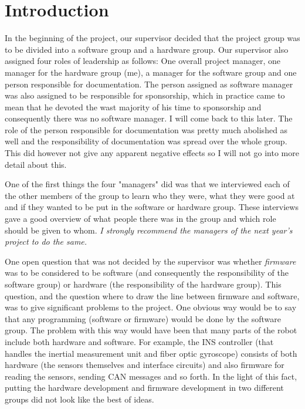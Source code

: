 
\section{Introduction}\label{sec:introduction}
In the beginning of the project, our supervisor decided that the project group was to be divided into a software group and a hardware group. Our supervisor also assigned four roles of leadership as follows: One overall project manager, one manager for the hardware group (me), a manager for the software group and one person responsible for documentation. \newline
The person assigned as software manager was also assigned to be responsible for sponsorship, which in practice came to mean that he devoted the wast majority of his time to sponsorship and consequently there was no software manager. I will come back to this later. \newline
The role of the person responsible for documentation was pretty much abolished as well and the responsibility of documentation was spread over the whole group. This did however not give any apparent negative effects so I will not go into more detail about this.

One of the first things the four "managers" did was that we interviewed each of the other members of the group to learn who they were, what they were good at and if they wanted to be put in the software or hardware group. These interviews gave a good overview of what people there was in the group and which role should be given to whom. \emph{I strongly recommend the managers of the next year's project to do the same.}

One open question that was not decided by the supervisor was whether \emph{firmware} was to be considered to be software (and consequently the responsibility of the software group) or hardware (the responsibility of the hardware group). This question, and the question where to draw the line between firmware and software, was to give significant problems to the project. \newline
One obvious way would be to say that any programming (software or firmware) would be done by the software group. The problem with this way would have been that many parts of the robot include both hardware and software. For example, the INS controller (that handles the inertial measurement unit and fiber optic gyroscope) consists of both hardware (the sensors themselves and interface circuits) and also firmware for reading the sensors, sending CAN messages and so forth. In the light of this fact, putting the hardware development and firmware development in two different groups did not look like the best of ideas.

